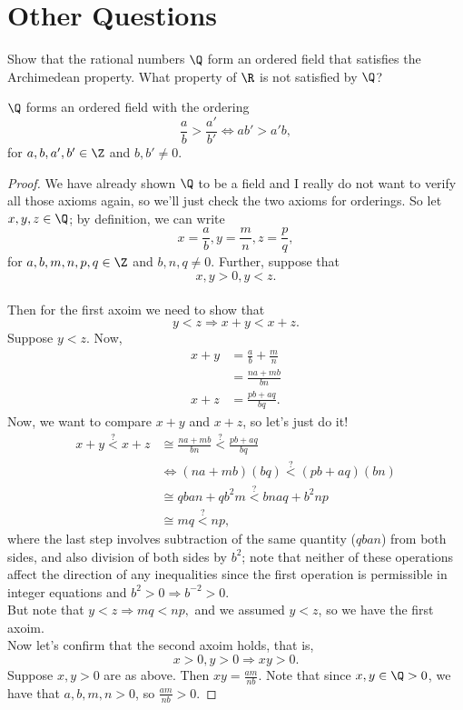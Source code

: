 \documentclass{assignment}
\begin{document}
\section*{Other Questions}
\begin{question}[1]
  Show that the rational numbers $\Q$ form an ordered field that satisfies the Archimedean property.
What property of $\R$ is not satisfied by $\Q$?
\end{question}
\begin{proposition}
  $\Q$ forms an ordered field with the ordering $$\frac{a}{b} > \frac{a'}{b'} \iff ab' > a'b,$$
  for $a,b,a',b'\in\Z$ and $b,b' \neq 0$.
\end{proposition}
\begin{proof}
  We have already shown $\Q$ to be a field and I really do not want to verify all those axioms
  again, so we'll just check the two axioms for orderings. So let $x,y,z\in\Q$; by definition, we
  can write $$x = \frac{a}{b}, y = \frac{m}{n}, z = \frac{p}{q},$$ for $a,b,m,n,p,q\in\Z$ and $b, n,
  q \neq 0$. Further, suppose that $$x, y > 0, y < z.$$ \\
  
  Then for the first axoim we need to show that $$y < z \Rightarrow x + y < x + z.$$ Suppose $y <
  z$. Now,
  \begin{align*}
    x + y &= \frac{a}{b} + \frac{m}{n} \\
          &= \frac{na + mb}{bn} \\
    x + z &= \frac{pb + aq}{bq}.
  \end{align*}
  Now, we want to compare $x+y$ and $x+z$, so let's just do it!
  \begin{align*}
    x+ y \stackrel{?}{<} x + z &\cong \frac{na + mb}{bn} \stackrel{?}{<} \frac{pb + aq}{bq} \\
                               &\iff (na + mb)(bq) \stackrel{?}{<} (pb + aq)(bn) \\
                               &\cong qban + qb^2m \stackrel{?}{<} bnaq + b^2np \\
                               &\cong mq \stackrel{?}{<} np,
  \end{align*}
  where the last step involves subtraction of the same quantity ($qban$) from both sides, and also 
  division of both sides by $b^2$; note that neither of these operations affect the direction of any
  inequalities since the first operation is permissible in integer equations and $b^2 > 0
  \Rightarrow b^{-2} > 0$. \\

  But note that $y < z \Rightarrow mq < np,$ and we assumed $y < z$, so we have the first axoim. \\

  Now let's confirm that the second axoim holds, that is, $$x > 0, y > 0 \Rightarrow xy > 0.$$
  Suppose $x,y >0$ are as above. Then $xy = \frac{am}{nb}$. Note that since $x,y\in\Q > 0$, we have 
  that $a,b,m,n > 0$, so $\frac{am}{nb} > 0$.
\end{proof}
\end{document}
